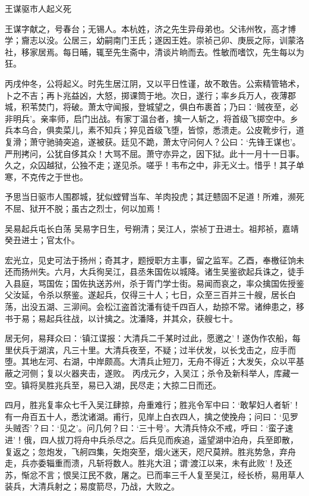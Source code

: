 \documentclass[]{article}
\begin{document}
王谋驱市人起义死

王谋字献之，号春台；无锡人。本杭姓，济之先生异母弟也。父讳州牧，高才博学；齎志以没。公居三，幼嗣南门王氏；遂因王姓。崇祯己卯、庚辰之际，训蒙洛社，移家居焉。每日晡，辄至先生斋中，清谈片晌而去。性敏而嗜饮，先生每以为狂。

丙戌仲冬，公将起义。时先生居江阴，又以平日性谨，故不敢告。公索精管辂术，卜之不吉；再卜兆益凶，大怒，掷课筒于地。次日，遂行；率乡兵万人，夜薄郡城，积苇焚门，将破。萧太守闻报，登城望之，俱白布裹首；乃曰：`贼夜至，必非明兵'。亲率师，启门出战。有家丁温台者，擒一人斩之，将首级飞掷空中。乡兵本乌合，俱卖菜儿，素不知兵；猝见首级飞堕，皆惊，悉溃走。公皮靴步行，道复滑；萧守驰骑突追，遂被获。廷见不跪，萧太守问何人？公曰：`先锋王谋也'。严刑拷问，公犹自侈其众！大骂不屈。萧守亦异之，因下狱。此十一月十一日事。久之，众囚越狱，公独不走；遂见杀。嗟乎！韦布之中，非无义士。惜乎！其子单寒，不克传之于世也。

予思当日驱市人围郡城，犹似螳臂当车、羊肉投虎；其迂戆固不足道！所难，濒死不屈、狱开不脱；虽古之烈士，何以加焉！

吴易起兵屯长白荡
吴易字日生，号朔清；吴江人，崇祯丁丑进士。祖邦祯，嘉靖癸丑进士；官太仆。

宏光立，见史可法于扬州；奇其才，题授职方主事，留之监军。乙酉，奉檄征饷未还而扬州失。六月，大兵徇吴江，县丞朱国佐以城降。诸生吴鉴欲起兵诛之，徒手入县庭，骂国佐；国佐执送苏州，杀于胥门学士街。易闻而哀之，率众擒国佐授鉴父汝延，令杀以祭鉴。遂起兵，仅得三十人；七日，众至三百并三十艘，居长白荡，出没五湖、三泖间。会松江盗首沈潘有徒千四百人，劫掠不常。诸绅患之，移书于易；易起兵往战，以计擒之。沈潘降，并其众，获艘七十。

居无何，易拜众曰：`镇江谍报：大清兵二千某时过此，愿邀之'！遂伪作农船，每里伏兵于湖滨，凡三十里。大清兵夜至，不疑；过半伏发，以长戈击之，应手而堕。其地左河、右湖，中岸颇高。大清兵止短刀，无舟不得近；大发矢，众以平基蔽之河侧；复以火器夹击，遂败。
丙戌元夕，入吴江；杀令及新科举人，库藏一空。镇将吴胜兆兵至，易已入湖，民尽走；大掠二日而还。

四月，胜兆复率众七千入吴江肆掠，舟重难行；胜兆令军中曰：`敢挈妇人者斩'！有一舟百五十人，悉沈诸湖。甫行，见岸上白衣四人，擒之使挽舟；问曰：`见罗头贼否'？曰：`见之'。问几何？曰：`三十号'。大清兵恃众不戒，呼曰：`蛮子速进'！俄，四人拔刀将舟中兵杀尽之。后兵见而疾追，遥望湖中泊舟，兵至即散，复返之；忽炮发，飞舸四集，矢炮突至，烟火迷天，咫尺莫辨。胜兆势急，弃舟走，兵亦委辎重而溃，凡斩将数人。胜兆大沮；谓`渡江以来，未有此败'！及还苏，惭忿不言；恨吴江民不救，屠之。已而率三千人复至吴江，经长桥，易用草人装兵，大清兵射之；易度箭尽，乃战，大败之。
\end{document}
